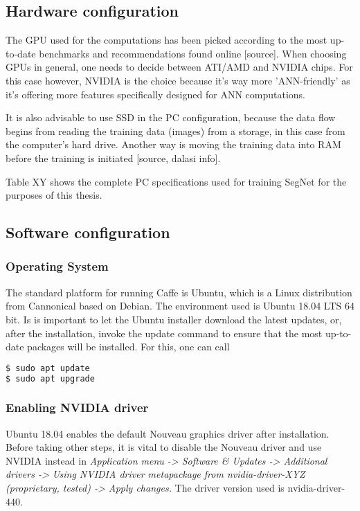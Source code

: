 \subsection{Hardware configuration}

The GPU used for the computations has been picked according to the most up-to-date benchmarks and recommendations found online [source]. When choosing GPUs in general, one needs to decide between ATI/AMD and NVIDIA chips. For this case however, NVIDIA is the choice because it's way more 'ANN-friendly' as it's offering more features specifically designed for ANN computations. 

It is also advisable to use SSD in the PC configuration, because the data flow begins from reading the training data (images) from a storage, in this case from the computer's hard drive. Another way is moving the training data into RAM before the training is initiated [source, dalasi info]. 

Table XY shows the complete PC specifications used for training SegNet for the purposes of this thesis.  

\subsection{Software configuration} 

\subsubsection{Operating System} 

The standard platform for running Caffe is Ubuntu, which is a Linux distribution from Cannonical based on Debian. The environment used is Ubuntu 18.04 LTS 64 bit. Is is important to let the Ubuntu installer download the latest updates, or, after the installation, invoke the update command to ensure that the most up-to-date packages will be installed. For this, one can call

\begin{lstlisting}[language=bash]
$ sudo apt update
$ sudo apt upgrade
\end{lstlisting}

\subsubsection{Enabling NVIDIA driver}

Ubuntu 18.04 enables the default Nouveau graphics driver after installation. Before taking other steps, it is vital to disable the Nouveau driver and use NVIDIA instead in \textit{Application menu -> Software \& Updates -> Additional drivers
	-> Using NVIDIA driver metapackage from nvidia-driver-XYZ (proprietary, tested) -> Apply changes.} The driver version used is nvidia-driver-440.


